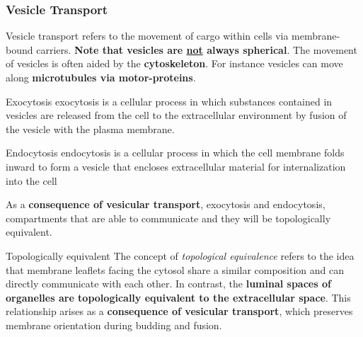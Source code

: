 \documentclass[../main.tex]{subfiles}
\begin{document}
\subsubsection{Vesicle Transport}
Vesicle transport refers to the movement of cargo within cells via membrane-bound carriers. \textbf{Note that vesicles are \underline{not} always spherical}. The movement of vesicles is often aided by the \textbf{cytoskeleton}. For instance vesicles can move along \textbf{microtubules via motor-proteins}. 

\begin{DefWithTitle}{Exocytosis}
	\gls{exocytosis} is a cellular process in which substances contained in vesicles are released from the cell to the extracellular environment by fusion of the vesicle with the plasma membrane. 
\end{DefWithTitle}

\begin{DefWithTitle}{Endocytosis}
	\gls{endocytosis} is a cellular process in which the cell membrane folds inward to form a vesicle that encloses extracellular material for internalization into the cell
\end{DefWithTitle}

\noindent As a \textbf{consequence of vesicular transport}, exocytosis and endocytosis, compartments that are able to communicate and they will be topologically equivalent. 

\begin{DefWithTitle}{Topologically equivalent}
	The concept of \textit{topological equivalence} refers to the idea that membrane leaflets facing the cytosol share a similar composition and can directly communicate with each other. In contrast, the \textbf{luminal spaces of organelles are topologically equivalent to the extracellular space}. This relationship arises as a \textbf{consequence of vesicular transport}, which preserves membrane orientation during budding and fusion.
\end{DefWithTitle}
\end{document}

